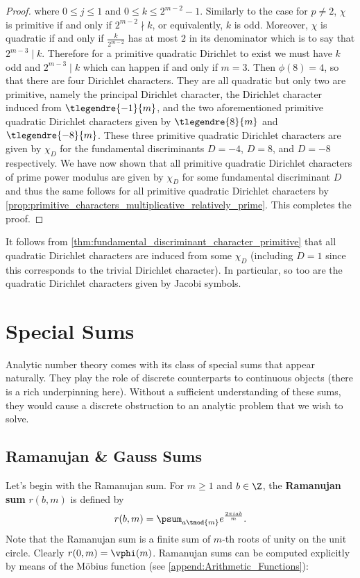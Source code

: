 \begin{proof}
      where $0 \le j \le 1$ and $0 \le k \le 2^{m-2}-1$. Similarly to the case for $p \neq 2$, $\chi$ is primitive if and only if $2^{m-2} \nmid k$, or equivalently, $k$ is odd. Moreover, $\chi$ is quadratic if and only if $\frac{k}{2^{m-2}}$ has at most $2$ in its denominator which is to say that $2^{m-3} \mid k$. Therefore for a primitive quadratic Dirichlet to exist we must have $k$ odd and $2^{m-3} \mid k$ which can happen if and only if $m = 3$. Then $\phi(8) = 4$, so that there are four Dirichlet characters. They are all quadratic but only two are primitive, namely the principal Dirichlet character, the Dirichlet character induced from $\tlegendre{-1}{m}$, and the two aforementioned primitive quadratic Dirichlet characters given by $\tlegendre{8}{m}$ and $\tlegendre{-8}{m}$. These three primitive quadratic Dirichlet characters are given by $\chi_{D}$ for the fundamental discriminants $D = -4$, $D = 8$, and $D = -8$ respectively. We have now shown that all primitive quadratic Dirichlet characters of prime power modulus are given by $\chi_{D}$ for some fundamental discriminant $D$ and thus the same follows for all primitive quadratic Dirichlet characters by \cref{prop:primitive_characters_multiplicative_relatively_prime}. This completes the proof.
    \end{proof}

    It follows from \cref{thm:fundamental_discriminant_character_primitive} that all quadratic Dirichlet characters are induced from some $\chi_{D}$ (including $D = 1$ since this corresponds to the trivial Dirichlet character). In particular, so too are the quadratic Dirichlet characters given by Jacobi symbols.
  \section{Special Sums}
    Analytic number theory comes with its class of special sums that appear naturally. They play the role of discrete counterparts to continuous objects (there is a rich underpinning here). Without a sufficient understanding of these sums, they would cause a discrete obstruction to an analytic problem that we wish to solve.
    \subsection*{Ramanujan \& Gauss Sums}
      Let's begin with the Ramanujan sum. For $m \ge 1$ and $b \in \Z$, the \textbf{Ramanujan sum} $r(b,m)$ is defined by
      \[
        r(b,m) = \psum_{a \tmod{m}}e^{\frac{2\pi iab}{m}}.
      \]
      Note that the Ramanujan sum is a finite sum of $m$-th roots of unity on the unit circle. Clearly $r(0,m) = \vphi(m)$. Ramanujan sums can be computed explicitly by means of the M\"obius function (see \cref{append:Arithmetic_Functions}):

